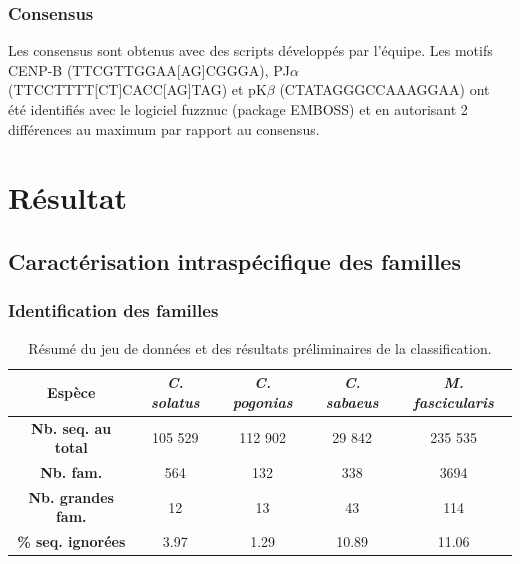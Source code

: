 \documentclass[12pt,a4paper]{article}
\begin{document}
		\subsubsection{Consensus}
Les consensus sont obtenus avec des scripts développés par l'équipe. Les motifs CENP-B (TTCGTTGGAA[AG]CGGGA), PJ$\alpha$ (TTCCTTTT[CT]CACC[AG]TAG) et pK$\beta$ (CTATAGGGCCAAAGGAA) ont été identifiés avec le logiciel fuzznuc (package EMBOSS) \cite{Rice2000} et en autorisant 2 différences au maximum par rapport au consensus.

\section{Résultat}
	\subsection{Caractérisation intraspécifique des familles}
			\subsubsection{Identification des familles}
		
		\begin{table}
			\center
			\begin{tabular}{|c|c|c|c|c|}
   			\hline
  			\textbf{Espèce} & \textit{C. solatus} & \textit{C. pogonias} & \textit{C. sabaeus} & \textit{M. fascicularis}\\
		    \hline
   			\textbf{Nb. seq. au total} & 105 529 & 112 902 & 29 842 & 235 535 \\
   			\hline
   			\textbf{Nb. fam.} & 564 & 132 & 338 & 3694\\
   			\hline
   			\textbf{Nb. grandes fam.} & 12 & 13 & 43 & 114\\
   			\hline
   			\textbf{\% seq. ignorées} & 3.97 & 1.29 & 10.89 & 11.06\\
   			\hline
			\end{tabular}
			\caption{Résumé du jeu de données et des résultats préliminaires de la classification.}
			\label{tab_res}
		\end{table}
		
\end{document}
